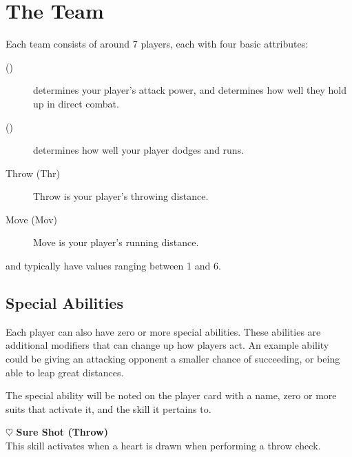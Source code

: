 \section{The Team} \label{the-team}
Each team consists of around 7 players, each with four basic attributes:

\begin{description}
    \item[\strength{} (\str{})] \strength{} determines your player's attack power, and determines how well they hold up in direct combat.
    \item[\agility{} (\agi{})] \agility{} determines how well your player dodges and runs.
    \item[Throw (Thr)] Throw is your player's throwing distance.
    \item[Move (Mov)] Move is your player's running distance.
\end{description}

\strength{} and \agility{} typically have values ranging between 1 and 6.


\subsection{Special Abilities}
Each player can also have zero or more special abilities.
These abilities are additional modifiers that can change up how players act.
An example ability could be giving an attacking opponent a smaller chance of succeeding, or being able to leap great distances.

The special ability will be noted on the player card with a name, zero or more suits that activate it, and the skill it pertains to.

\begin{example}
    $\heartsuit$ \textbf{Sure Shot (Throw)}\\
    This skill activates when a heart is drawn when performing a throw check.
\end{example}